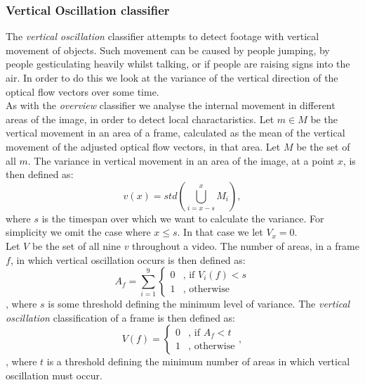 \subsubsection{Vertical Oscillation classifier}\label{sec:verticaloscillationclassifier}
%
The \textit{vertical oscillation} classifier attempts to detect footage with vertical movement of objects. Such movement can be caused by people jumping, by people gesticulating heavily whilst talking, or if people are raising signs into the air. In order to do this we look at the variance of the vertical direction of the optical flow vectors over some time.\\
As with the \textit{overview} classifier we analyse the internal movement in different areas of the image, in order to detect local charactaristics. Let $m \in M$ be the vertical movement in an area of a frame, calculated as the mean of the vertical movement of the adjusted optical flow vectors, in that area. Let $M$ be the set of all $m$. The variance in vertical movement in an area of the image, at a point $x$, is then defined as:
%
\begin{equation}
v(x) = std(\bigcup_{i=x-s}^{x} M_{i}),
\end{equation}
%
where $s$ is the timespan over which we want to calculate the variance. For simplicity we omit the case where $x \leq s$. In that case we let $V_{x} = 0$.\\
Let $V$ be the set of all nine $v$ throughout a video. The number of areas, in a frame $f$, in which vertical oscillation occurs is then defined as:
%
\begin{equation}
A_{f} = \sum_{i=1}^{9}
\begin{cases}
0 & \text{, if } V_{i}(f) < s\\
1 &  \text{, otherwise}
\end{cases}
\end{equation},
%
where $s$ is some threshold defining the minimum level of variance. The \textit{vertical oscillation} classification of a frame is then defined as:
%
\begin{equation}
V(f) =
\begin{cases}
0 & \text{, if } A_{f} < t\\
1 &  \text{, otherwise}
\end{cases},
\end{equation},
%
where $t$ is a threshold defining the minimum number of areas in which vertical oscillation must occur.
%
%
